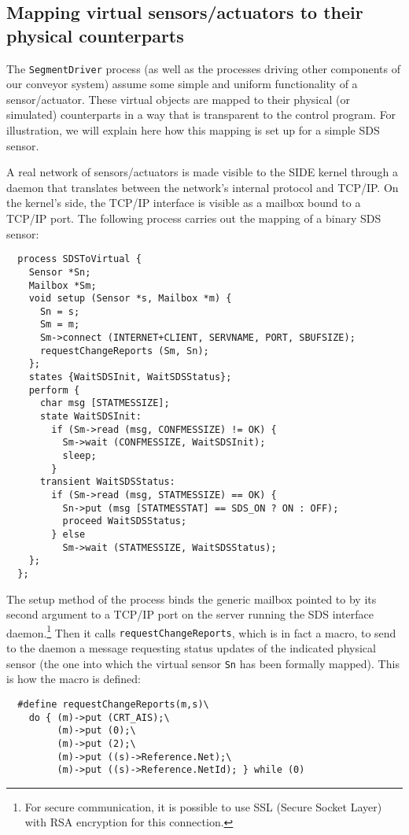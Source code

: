 \subsection{Mapping virtual sensors/actuators to their physical counterparts}

The {\tt SegmentDriver} process (as well as the processes driving other
components of our conveyor system) assume some simple and uniform functionality
of a sensor/actuator.
These virtual objects are mapped to their physical (or simulated) counterparts
in a way that is transparent to the control program.
For illustration, we will
explain here how this mapping is set up for a simple
SDS sensor.

A real network of sensors/actuators is made visible to the SIDE kernel through a
daemon that translates between the network's internal protocol and TCP/IP.
On the kernel's side, the TCP/IP interface is visible
as a mailbox bound to a TCP/IP port.
The following process carries out the mapping of a binary SDS sensor:

{\small\begin{verbatim}
  process SDSToVirtual {
    Sensor *Sn;
    Mailbox *Sm;
    void setup (Sensor *s, Mailbox *m) {
      Sn = s;
      Sm = m;
      Sm->connect (INTERNET+CLIENT, SERVNAME, PORT, SBUFSIZE);
      requestChangeReports (Sm, Sn);
    };
    states {WaitSDSInit, WaitSDSStatus};
    perform {
      char msg [STATMESSIZE];
      state WaitSDSInit:
        if (Sm->read (msg, CONFMESSIZE) != OK) {
          Sm->wait (CONFMESSIZE, WaitSDSInit);
          sleep;
        }
      transient WaitSDSStatus:
        if (Sm->read (msg, STATMESSIZE) == OK) {
          Sn->put (msg [STATMESSTAT] == SDS_ON ? ON : OFF);
          proceed WaitSDSStatus;
        } else
          Sm->wait (STATMESSIZE, WaitSDSStatus);
    };
  };
\end{verbatim}}

The setup method of the process binds the generic mailbox pointed to
by its second argument to a TCP/IP port on the server running the SDS
interface daemon.\footnote{For secure communication, it is possible to
use SSL (Secure Socket Layer) with RSA encryption for this connection.}
Then it calls {\tt requestChangeReports}, which is in fact a macro,
to send to the daemon a message requesting status updates of the indicated
physical sensor (the one into which the virtual sensor {\tt Sn} has been
formally mapped).
This is how the macro is defined:

{\small\begin{verbatim}
  #define requestChangeReports(m,s)\
    do { (m)->put (CRT_AIS);\
         (m)->put (0);\
         (m)->put (2);\
         (m)->put ((s)->Reference.Net);\
         (m)->put ((s)->Reference.NetId); } while (0)
\end{verbatim}}


